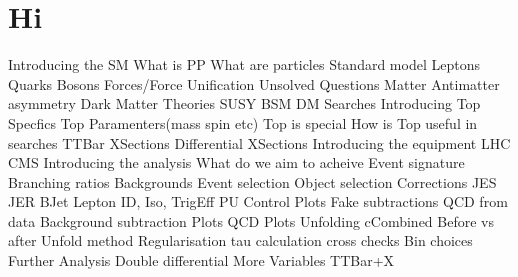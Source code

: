 \section{Hi}




























Introducing the SM
	What is PP
	What are particles
	Standard model
	Leptons
	Quarks
	Bosons
	Forces/Force Unification
	Unsolved Questions
		Matter Antimatter asymmetry
		Dark Matter
	Theories
		SUSY
		BSM
		DM Searches
Introducing Top Specfics
	Top Paramenters(mass spin etc)
	Top is special
	How is Top useful in searches
	TTBar
	XSections
	Differential XSections
Introducing the equipment
	LHC
	CMS
Introducing the analysis
	What do we aim to acheive
	Event signature
	Branching ratios
	Backgrounds
	Event selection
	Object selection
Corrections
	JES
	JER
	BJet
	Lepton ID, Iso, TrigEff
	PU
Control Plots
	Fake subtractions
	QCD from data
	Background subtraction
	Plots
	QCD Plots
Unfolding
	cCombined Before vs after
	Unfold method
	Regularisation
	tau calculation
	cross checks
	Bin choices
Further Analysis
	Double differential
	More Variables
	TTBar+X









